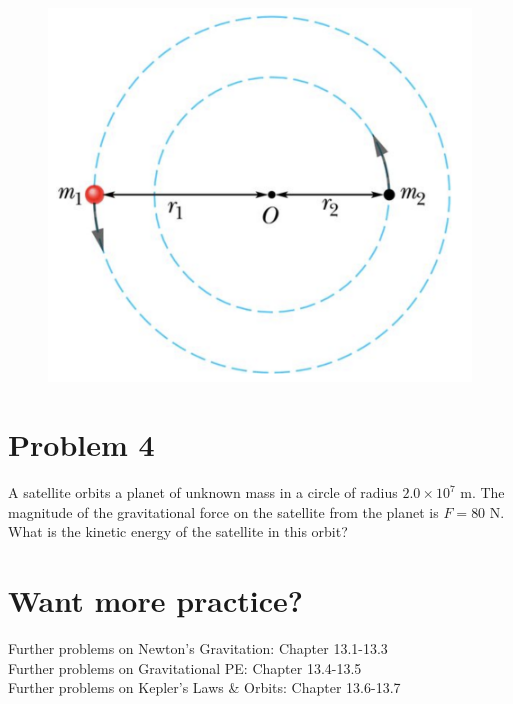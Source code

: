 \documentclass[11pt]{article}
\begin{document}
\begin{figure}[h]
\includegraphics[scale=0.25]{2021-W8-Q3}

\end{figure}

\section*{Problem 4}

A satellite orbits a planet of unknown mass in a circle of radius $2.0 \times 10^7$ m. The magnitude of the gravitational force on the satellite from the planet is $F = 80$ N.  What is the kinetic energy of the satellite in this orbit?\\

\section*{Want more practice?}
\small
Further problems on Newton's Gravitation: Chapter 13.1-13.3 \\
Further problems on Gravitational PE: Chapter 13.4-13.5 \\
Further problems on Kepler's Laws \& Orbits: Chapter 13.6-13.7 \\
\end{document}
